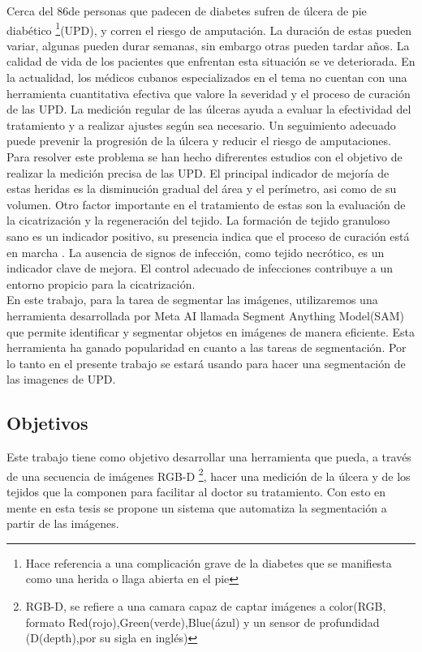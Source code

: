 \documentclass[12pt]{article}
\begin{document}
	Cerca del 86\textdiscount \space de personas que padecen de diabetes sufren de \'ulcera de pie diab\'etico \footnote{Hace referencia a una complicaci\'on grave de la diabetes que se manifiesta como una herida o llaga abierta en el pie}(UPD), y corren el riesgo de amputaci\'on. La duraci\'on de estas pueden variar, algunas pueden durar semanas, sin embargo otras pueden tardar a\~nos. La calidad de vida de los pacientes que enfrentan esta situaci\'on se ve deteriorada.  En la actualidad, los médicos cubanos especializados en el tema no cuentan con una herramienta cuantitativa efectiva que valore la severidad y el proceso de curación de las UPD. La medición regular de las úlceras ayuda a evaluar la efectividad del tratamiento y a realizar ajustes según sea necesario. Un seguimiento adecuado puede prevenir la progresión de la úlcera y reducir el riesgo de amputaciones.
	\\
	
	Para resolver este problema se han hecho difrerentes estudios con el objetivo de realizar la medici\'on precisa de las UPD.
	El principal indicador de mejor\'ia de estas heridas es la disminuci\'on gradual del \'area y el per\'imetro, asi como de su volumen. Otro factor importante en el tratamiento de estas son la evaluación de la cicatrización y la regeneración del tejido. La formación de tejido granuloso sano es un indicador positivo, su presencia indica que el proceso de curación está en marcha \parencite{molnlycke2023}. La ausencia de signos de infección, como tejido necr\'otico, es un indicador clave de mejora. El control adecuado de infecciones contribuye a un entorno propicio para la cicatrización. 
	\\
	
	En este trabajo, para la tarea de segmentar las im\'agenes, utilizaremos una herramienta desarrollada por Meta AI llamada Segment Anything Model(SAM)\parencite{segmentanything2023} que permite identificar y segmentar objetos en imágenes de manera eficiente. Esta herramienta ha ganado popularidad en cuanto a las tareas de segmentaci\'on. Por lo tanto en el presente trabajo se estar\'a usando para hacer una segmentaci\'on de las imagenes de UPD.
	
	\subsection{Objetivos}
	Este trabajo tiene como objetivo desarrollar una herramienta que pueda, a trav\'es de una secuencia de im\'agenes RGB-D \footnote{RGB-D, se refiere a una camara capaz de captar im\'agenes a color(RGB, formato Red(rojo),Green(verde),Blue(\'azul) y un sensor de profundidad (D(depth),por su sigla en ingl\'es)}, hacer una medici\'on de la \'ulcera y de los tejidos que la componen para facilitar al doctor su tratamiento. Con esto en mente en esta tesis se propone un sistema que automatiza la segmentaci\'on a partir de las im\'agenes.
	\\
	
\end{document}
